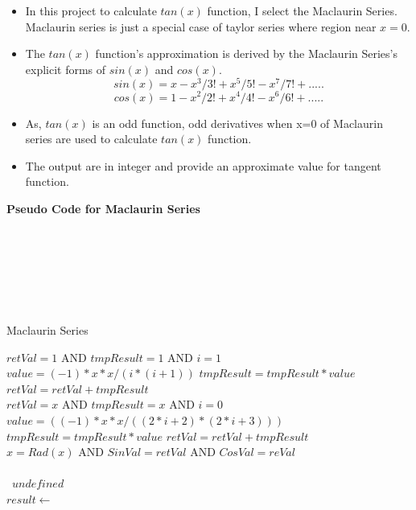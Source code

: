 \documentclass[letterpaper, 11pt]{report}
\begin{document}
\begin{itemize}
\item In this project to calculate $tan(x)$ function, I select the Maclaurin Series.
Maclaurin series is just a special case of
taylor series where region near $x=0$.
\item The $tan(x)$ function's approximation is derived by the Maclaurin Series's explicit forms of $sin(x)$ and $cos(x)$.
\begin{equation} 
sin(x) = x-x^3/3!+x^5/5!-x^7/7!+.....
\end{equation}
\begin{equation} 
cos(x) = 1-x^2/2!+x^4/4!-x^6/6!+.....
\end{equation}
\item As, $tan(x)$ is an odd function, odd derivatives when x=0 of Maclaurin series are used to calculate $tan(x)$ function. \item The output are in integer and provide an approximate value for tangent function.
\end{itemize}

\textbf{Pseudo Code for Maclaurin Series}
\\\\\\\\\\\\\
\begin{algorithm}
\caption{Maclaurin Series} \label{alg:cap}
\begin{algorithmic}
\Require $retVal = 1$ AND $tmpResult = 1$ AND $i=1$
\State $value = (-1)*x*x/(i*(i+1))$
\State $tmpResult = tmpResult * value$
    \EndIf   
    \State $retVal = retVal + tmpResult$ 
\EndFor \\
\EndFunction
\Require $retVal = x$ AND $tmpResult = x$ AND $i=0$
\State $value = ((-1)*x*x/((2*i+2)*(2*i+3)))$
\State $tmpResult = tmpResult * value$
    \EndIf   
    \State $retVal = retVal + tmpResult$ 
\EndFor \\
\EndFunction
\Require $x = Rad(x)$ AND $SinVal = retVal$ AND $CosVal= reVal$
\\\ 
    \EndIf   
{}
\\\    \Return $undefined$
    \EndIf \\      
\EndFunction
\State $result \gets $
\end{algorithmic}
\end{algorithm}
\pagebreak
\end{document}

